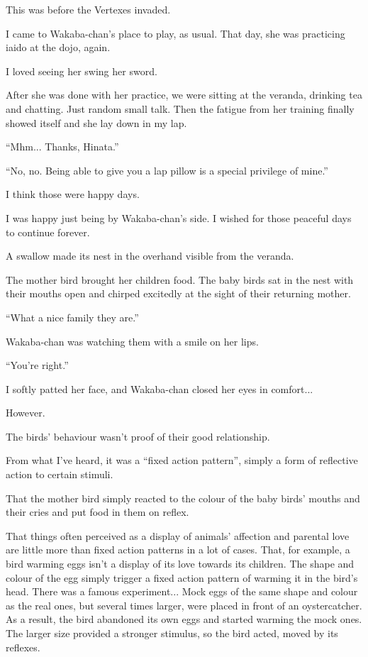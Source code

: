 
This was before the Vertexes invaded.

I came to Wakaba-chan's place to play, as usual. That day, she was practicing iaido at the dojo, again.

I loved seeing her swing her sword.

After she was done with her practice, we were sitting at the veranda, drinking tea and chatting. Just random small talk. Then the fatigue from her training finally showed itself and she lay down in my lap.

``Mhm... Thanks, Hinata.''

``No, no. Being able to give you a lap pillow is a special privilege of mine.''

I think those were happy days.

I was happy just being by Wakaba-chan's side. I wished for those peaceful days to continue forever.

A swallow made its nest in the overhand visible from the veranda.

The mother bird brought her children food. The baby birds sat in the nest with their mouths open and chirped excitedly at the sight of their returning mother.

``What a nice family they are.''

Wakaba-chan was watching them with a smile on her lips.

``You're right.''

I softly patted her face, and Wakaba-chan closed her eyes in comfort...

However.

The birds' behaviour wasn't proof of their good relationship.

From what I've heard, it was a ``fixed action pattern'', simply a form of reflective action to certain stimuli.

That the mother bird simply reacted to the colour of the baby birds' mouths and their cries and put food in them on reflex.

That things often perceived as a display of animals' affection and parental love are little more than fixed action patterns in a lot of cases. That, for example, a bird warming eggs isn't a display of its love towards its children. The shape and colour of the egg simply trigger a fixed action pattern of warming it in the bird's head. There was a famous experiment... Mock eggs of the same shape and colour as the real ones, but several times larger, were placed in front of an oystercatcher. As a result, the bird abandoned its own eggs and started warming the mock ones. The larger size provided a stronger stimulus, so the bird acted, moved by its reflexes.

